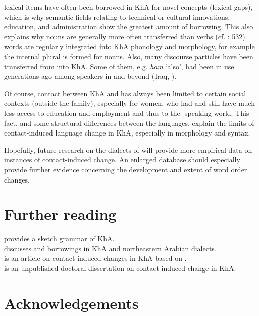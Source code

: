 \documentclass[output=paper,nonflat]{langsci/langscibook}
\begin{document}
 lexical items have often been borrowed in KhA for novel concepts (lexical gaps), which is why semantic fields relating to technical or cultural innovations, education, and administration show the greatest amount of  borrowing. This also explains why nouns are generally more often transferred than verbs (cf. \citealt{Lucas2015}: 532).  words are regularly integrated into KhA phonology and morphology, for example the  {internal plural} is formed for  nouns. Also, many discourse particles have been transferred from  into KhA. Some of them, e.g. \textit{ham} ‘also’, had been in use generations ago among  speakers in  and beyond (Iraq, ).

Of course, contact between KhA and  has always been limited to certain social contexts (outside the family), especially for women, who had and still have much less access to education and employment and thus to the -speaking world. This fact, and some structural differences between the languages, explain the limits of contact-induced {language change} in KhA, especially in morphology and syntax.

Hopefully, {future} research on the dialects of  will provide more empirical data on instances of contact-induced change. An enlarged database should especially provide further evidence concerning the development and extent of {word order} changes.

\section*{Further reading}


\citet{Ingham2011khuz} provides a sketch grammar of KhA.\\
\citet{Ingham2005} discusses  and  borrowings in KhA and northeastern Arabian dialects.\\
\citet{MatrasShabibi2007} is an {article} on contact-induced changes in KhA based on \citet{Shabibi2006}.\\
\citet{Shabibi2006} is an unpublished doctoral dissertation on contact-induced change in KhA.



\section*{Acknowledgements}
\end{document}
